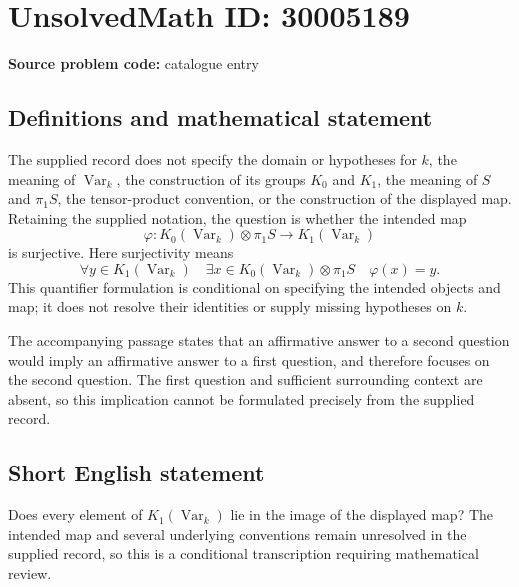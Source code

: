 \documentclass[11pt]{article}
\begin{document}
\section*{UnsolvedMath ID: 30005189}
\textbf{Source problem code:} catalogue entry
\subsection{Definitions and mathematical statement}
The supplied record does not specify the domain or hypotheses for \(k\), the meaning of \(\operatorname{Var}_k\), the construction of its groups \(K_0\) and \(K_1\), the meaning of \(S\) and \(\pi_1S\), the tensor-product convention, or the construction of the displayed map. Retaining the supplied notation, the question is whether the intended map
\[
\varphi\colon K_0(\operatorname{Var}_k)\otimes\pi_1S
\longrightarrow K_1(\operatorname{Var}_k)
\]
is surjective. Here surjectivity means
\[
\forall y\in K_1(\operatorname{Var}_k)\quad
\exists x\in K_0(\operatorname{Var}_k)\otimes\pi_1S
\quad \varphi(x)=y.
\]
This quantifier formulation is conditional on specifying the intended objects and map; it does not resolve their identities or supply missing hypotheses on \(k\).

The accompanying passage states that an affirmative answer to a second question would imply an affirmative answer to a first question, and therefore focuses on the second question. The first question and sufficient surrounding context are absent, so this implication cannot be formulated precisely from the supplied record.
\subsection{Short English statement}
Does every element of \(K_1(\operatorname{Var}_k)\) lie in the image of the displayed map? The intended map and several underlying conventions remain unresolved in the supplied record, so this is a conditional transcription requiring mathematical review.
\end{document}
